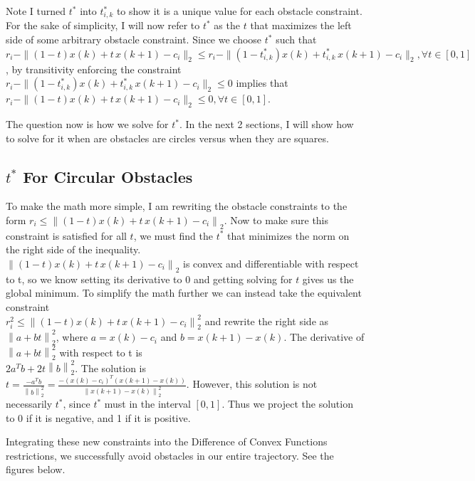 \documentclass[conference]{IEEEtran}
\newcommand{\norm}[1]{\left\lVert #1 \right\rVert}
\begin{document}
Note I turned $t^*$ into $t_{i,k}^*$ to show it is a unique value for each obstacle constraint.
For the sake of simplicity, I will now refer to $t^*$ as the $t$ that maximizes
the left side of some arbitrary obstacle constraint. Since we choose $t^*$ such that \\
 $r_i-\|(1-t)x(k)+t\,x(k+1)-c_i\|_2 \le r_i-\|(1-t_{i,k}^*)x(k)+t_{i,k}^*\,x(k+1)-c_i\|_2, 
 \forall t\in[0,1]$, by transitivity enforcing the constraint \\
 $r_i-\|(1-t_{i,k}^*)x(k)+t_{i,k}^*\,x(k+1)-c_i\|_2 \le 0$ implies that \\
 $r_i-\|(1-t)x(k)+t\,x(k+1)-c_i\|_2 \le 0, \forall t\in[0,1]$.

The question now is how we solve for $t^*$. In the next 2 sections, I will show 
how to solve for it when are obstacles are circles versus when they are squares.

\subsection{$t^*$ For Circular Obstacles}

To make the math more simple, I am rewriting the obstacle constraints to the form 
$r_i \le \norm{(1-t)x(k)+t\,x(k+1)-c_i}_2$. 
Now to make sure this constraint is satisfied for all $t$, we must find the 
$t^*$ that minimizes the norm on the right side of the inequality. \\ 
$\norm{(1-t)x(k)+t\,x(k+1)-c_i}_2$ is convex and differentiable with respect to t, 
so we know setting its derivative to 0 and getting solving for $t$ gives us the global minimum.
 To simplify the math further we can instead take the equivalent constraint \\
 $r_i^2 \le \norm{(1-t)x(k)+t\,x(k+1)-c_i}_{2}^2$ and rewrite the right side as $\norm{a + bt}_{2}^2$, where $a = x(k) - c_i$ and $b = x(k+1) - x(k)$. The derivative 
 of $\norm{a + bt}_{2}^2$ with respect to t is \\
 $2a^T b + 2t\norm{b}_{2}^2$. The solution is \\
 $t = \frac{-a^T b}{\norm{b}_{2}^{2}} = \frac{-(x(k)-c_i)^T(x(k+1)-x(k))}{\norm{x(k+1)-x(k)}_{2}^{2}}$. 
 However, this solution is not necessarily $t^*$, since $t^*$ must in the interval 
 $[0,1]$. Thus we project the solution to 0 if it is negative, and 1 if it is positive. 

 Integrating these new constraints into the Difference of Convex Functions restrictions, we successfully 
 avoid obstacles in our entire trajectory. See the figures below.
\end{document}

